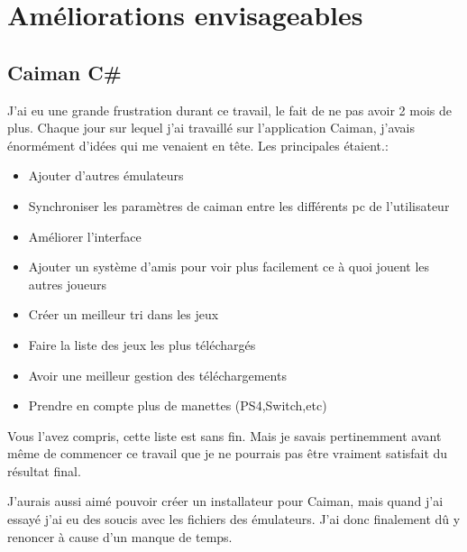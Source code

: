 \documentclass[a4paper,12pt,french]{sphinxmanual}
\begin{document}
\section{Améliorations envisageables}
\label{\detokenize{conclusion:ameliorations-envisageables}}

\subsection{Caiman C\#}
\label{\detokenize{conclusion:caiman-c}}
\sphinxAtStartPar
J’ai eu une grande frustration durant ce travail, le fait de ne pas avoir 2 mois de plus. Chaque jour sur lequel j’ai travaillé sur l’application Caiman, j’avais énormément d’idées qui me venaient en tête. Les principales étaient.:
\begin{itemize}
\item {} 
\sphinxAtStartPar
Ajouter d’autres émulateurs

\item {} 
\sphinxAtStartPar
Synchroniser les paramètres de caiman entre les différents pc de l’utilisateur

\item {} 
\sphinxAtStartPar
Améliorer l’interface

\item {} 
\sphinxAtStartPar
Ajouter un système d’amis pour voir plus facilement ce à quoi jouent les autres joueurs

\item {} 
\sphinxAtStartPar
Créer un meilleur tri dans les jeux

\item {} 
\sphinxAtStartPar
Faire la liste des jeux les plus téléchargés

\item {} 
\sphinxAtStartPar
Avoir une meilleur gestion des téléchargements

\item {} 
\sphinxAtStartPar
Prendre en compte plus de manettes (PS4,Switch,etc)

\end{itemize}

\sphinxAtStartPar
Vous l’avez compris, cette liste est sans fin. Mais je savais pertinemment avant même de commencer ce travail que je ne pourrais pas être vraiment satisfait du résultat final.

\sphinxAtStartPar
J’aurais aussi aimé pouvoir créer un installateur pour Caiman, mais quand j’ai essayé j’ai eu des soucis avec les fichiers des émulateurs. J’ai donc finalement dû y renoncer à cause d’un manque de temps.
\end{document}
